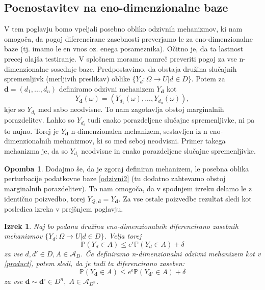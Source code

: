 \documentclass[12pt,a4paper]{amsart}
\theoremstyle{definition} %
\newtheorem{opomba}[definicija]{Opomba}
\theoremstyle{plain} %
\newtheorem{izrek}[definicija]{Izrek}
\begin{document}
\subsection{Poenostavitev na eno-dimenzionalne baze}
V tem poglavju bomo vpeljali posebno obliko odzivnih mehanizmov, ki nam omogoča, da pogoj diferencirane zasebnosti preverjamo le za eno-dimenzionalne baze (tj. imamo le en vnos oz. enega posameznika). Očitno je, da ta lastnost precej olajša testiranje. V splošnem moramo namreč preveriti pogoj za vse n-dimenzionalne sosednje baze.
\newline
\newline
Predpostavimo, da obstaja družina slučajnih spremenljivk (merljivih preslikav) oblike $\{ Y_d: \Omega \rightarrow U | d \in D\}$.  Potem za $\textbf{d} = (d_1,...,d_n)$ definiramo odzivni mehanizem $Y_{\textbf{d}}$ kot  
\begin{equation}\label{product}
Y_{\textbf{d}} (\omega) = (Y_{d_1} (\omega) , ... , Y_{d_n} (\omega)), \tag{5}
\end{equation}
kjer so $Y_{d_i}$ med sabo neodvisne. To nam zagotavlja obstoj marginalnih porazdelitev.  Lahko so $Y_{d_i}$ tudi enako porazdeljene slučajne spremenljivke, ni pa to nujno. Torej je $Y_{\textbf{d}}$ n-dimenzionalen mehanizem, sestavljen iz n eno-dimenzionalnih mehanizmov, ki so med seboj neodvisni. Primer takega mehanizma je, da so $Y_{d_i}$ neodvisne in enako porazdeljene slučajne spremenljivke.
\newline
\newline
\begin{opomba} Dodajmo še, da je zgoraj definiran mehanizem, le posebna oblika perturbacije podatkovne baze \eqref{odzivni2} (tu dodatno zahtevamo obstoj marginalnih porazdelitev). To nam omogoča, da v spodnjem izreku delamo le z identično poizvedbo, torej $Y_{Q, \textbf{d}}=Y_{\textbf{d}}$. Za vse ostale poizvedbe rezultat sledi kot posledica izreka v prejšnjem poglavju. 
\end{opomba}
\begin{izrek} Naj bo podana družina eno-dimenzionalnih diferencirano zasebnih mehanizmov $\{ Y_d: \Omega \rightarrow U | d \in D\}$. Velja torej
$$\mathbb{P}(Y_d \in A) \leq e^\epsilon \mathbb{P}(Y_d \in A) + \delta$$ 
za vse $d,d' \in D, A \in \mathcal{A}_D$. Če definiramo n-dimenzionalni odzivni mehanizem kot v \eqref{product}, potem sledi, da je tudi ta diferencirano zaseben:
$$\mathbb{P}(Y_{\textbf{d}} \in A) \leq e^\epsilon \mathbb{P}(Y_{\textbf{d'}} \in A) + \delta$$
za vse $\textbf{d} \sim \textbf{d'} \in D^n, \; A \in \mathcal{A}_{D^n}$.
\end{izrek}
\end{document}
